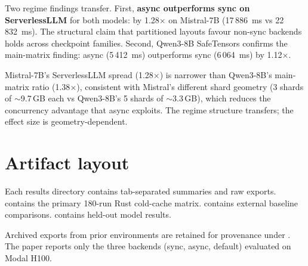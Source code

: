 Two regime findings transfer. First, \textbf{async outperforms sync on ServerlessLLM} for both models: by 1.28$\times$ on Mistral-7B (17\,886~ms vs 22\,832~ms). The structural claim that partitioned layouts favour non-sync backends holds across checkpoint families. Second, Qwen3-8B SafeTensors confirms the main-matrix finding: async (5\,412~ms) outperforms sync (6\,064~ms) by 1.12$\times$.

Mistral-7B's ServerlessLLM spread (1.28$\times$) is narrower than Qwen3-8B's main-matrix ratio (1.38$\times$), consistent with Mistral's different shard geometry (3 shards of $\sim$9.7\,GB each vs Qwen3-8B's 5 shards of $\sim$3.3\,GB), which reduces the concurrency advantage that async exploits. The regime structure transfers; the effect size is geometry-dependent.

\section{Artifact layout}
\label{app:artifact-layout}

Each results directory contains tab-separated summaries and raw exports.  contains the primary 180-run Rust cold-cache matrix.  contains external baseline comparisons.  contains held-out model results.

Archived exports from prior environments are retained for provenance under . The paper reports only the three backends (sync, async, default) evaluated on Modal H100.
